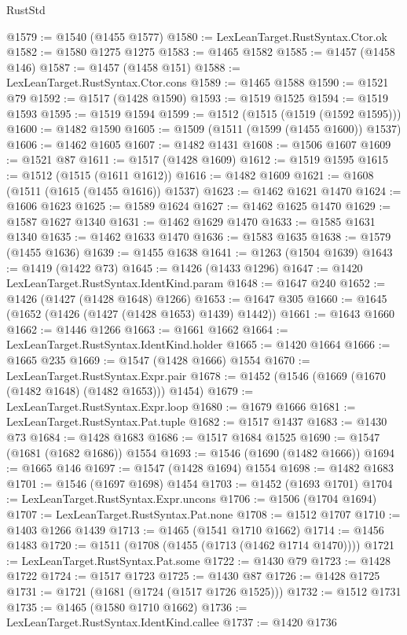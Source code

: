 \begin{lexlean}{RustStd}
\begin{coremodule}
{\begin{coremodule}
{{{{{{{{{{{{{{{{{{{{{{{{{{{{{{@1579 := @1540 (@1455 @1577)
@1580 := LexLeanTarget.RustSyntax.Ctor.ok
@1582 := @1580 @1275 @1275
@1583 := @1465 @1582
@1585 := @1457 (@1458 @146)
@1587 := @1457 (@1458 @151)
@1588 := LexLeanTarget.RustSyntax.Ctor.cons
@1589 := @1465 @1588
@1590 := @1521 @79
@1592 := @1517 (@1428 @1590)
@1593 := @1519 @1525
@1594 := @1519 @1593
@1595 := @1519 @1594
@1599 := @1512 (@1515 (@1519 (@1592 @1595)))
@1600 := @1482 @1590
@1605 := @1509 (@1511 (@1599 (@1455 @1600)) @1537)
@1606 := @1462 @1605
@1607 := @1482 @1431
@1608 := @1506 @1607
@1609 := @1521 @87
@1611 := @1517 (@1428 @1609)
@1612 := @1519 @1595
@1615 := @1512 (@1515 (@1611 @1612))
@1616 := @1482 @1609
@1621 := @1608 (@1511 (@1615 (@1455 @1616)) @1537)
@1623 := @1462 @1621 @1470
@1624 := @1606 @1623
@1625 := @1589 @1624
@1627 := @1462 @1625 @1470
@1629 := @1587 @1627 @1340
@1631 := @1462 @1629 @1470
@1633 := @1585 @1631 @1340
@1635 := @1462 @1633 @1470
@1636 := @1583 @1635
@1638 := @1579 (@1455 @1636)
@1639 := @1455 @1638
@1641 := @1263 (@1504 @1639)
@1643 := @1419 (@1422 @73)
@1645 := @1426 (@1433 @1296)
@1647 := @1420 LexLeanTarget.RustSyntax.IdentKind.param
@1648 := @1647 @240
@1652 := @1426 (@1427 (@1428 @1648) @1266)
@1653 := @1647 @305
@1660 := @1645 (@1652 (@1426 (@1427 (@1428 @1653) @1439) @1442))
@1661 := @1643 @1660
@1662 := @1446 @1266
@1663 := @1661 @1662
@1664 := LexLeanTarget.RustSyntax.IdentKind.holder
@1665 := @1420 @1664
@1666 := @1665 @235
@1669 := @1547 (@1428 @1666) @1554
@1670 := LexLeanTarget.RustSyntax.Expr.pair
@1678 := @1452 (@1546 (@1669 (@1670 (@1482 @1648) (@1482 @1653))) @1454)
@1679 := LexLeanTarget.RustSyntax.Expr.loop
@1680 := @1679 @1666
@1681 := LexLeanTarget.RustSyntax.Pat.tuple
@1682 := @1517 @1437
@1683 := @1430 @73
@1684 := @1428 @1683
@1686 := @1517 @1684 @1525
@1690 := @1547 (@1681 (@1682 @1686)) @1554
@1693 := @1546 (@1690 (@1482 @1666))
@1694 := @1665 @146
@1697 := @1547 (@1428 @1694) @1554
@1698 := @1482 @1683
@1701 := @1546 (@1697 @1698) @1454
@1703 := @1452 (@1693 @1701)
@1704 := LexLeanTarget.RustSyntax.Expr.uncons
@1706 := @1506 (@1704 @1694)
@1707 := LexLeanTarget.RustSyntax.Pat.none
@1708 := @1512 @1707
@1710 := @1403 @1266 @1439
@1713 := @1465 (@1541 @1710 @1662)
@1714 := @1456 @1483
@1720 := @1511 (@1708 (@1455 (@1713 (@1462 @1714 @1470))))
@1721 := LexLeanTarget.RustSyntax.Pat.some
@1722 := @1430 @79
@1723 := @1428 @1722
@1724 := @1517 @1723
@1725 := @1430 @87
@1726 := @1428 @1725
@1731 := @1721 (@1681 (@1724 (@1517 @1726 @1525)))
@1732 := @1512 @1731
@1735 := @1465 (@1580 @1710 @1662)
@1736 := LexLeanTarget.RustSyntax.IdentKind.callee
@1737 := @1420 @1736
}}}}}}}}}}}}}}}}}}}}}}}}}}}}}}
\end{coremodule}}
\end{coremodule}
\end{lexlean}
